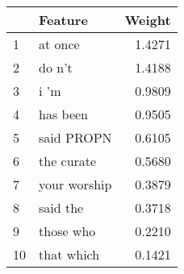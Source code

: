 \begin{tabular}{llr}
\toprule
{} &       Feature &  Weight \\
\midrule
1  &       at once &  1.4271 \\
2  &        do n't &  1.4188 \\
3  &          i 'm &  0.9809 \\
4  &      has been &  0.9505 \\
5  &    said PROPN &  0.6105 \\
6  &    the curate &  0.5680 \\
7  &  your worship &  0.3879 \\
8  &      said the &  0.3718 \\
9  &     those who &  0.2210 \\
10 &    that which &  0.1421 \\
\bottomrule
\end{tabular}
